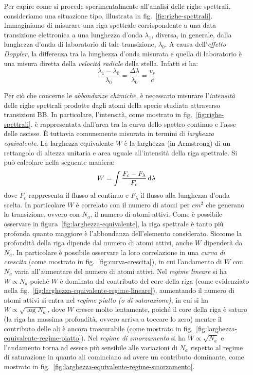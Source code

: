 Per capire come si procede sperimentalmente all'analisi delle righe spettrali, consideriamo una situazione tipo, illustrata in fig.~\ref{fig:righe-spettrali}. Immaginiamo di misurare una riga spettrale corrispondente a una data transizione elettronica a una lunghezza d'onda $\lambda_1$, diversa, in generale, dalla lunghezza d'onda di laboratorio di tale transizione, $\lambda_0$. A causa dell'\emph{effetto Doppler}, la differenza tra la lunghezza d'onda misurata e quella di laboratorio è una misura diretta della \emph{velocità radiale} della stella. Infatti si ha:
\begin{equation}\label{eq:effetto-doppler}
    \dfrac{\lambda_1 - \lambda_0}{\lambda_0} = \dfrac{\Delta \lambda}{\lambda_0} = \dfrac{v_r}{c}
\end{equation}

Per ciò che concerne le \emph{abbondanze chimiche}, è necessario misurare l'\emph{intensità} delle righe spettrali prodotte dagli atomi della specie studiata attraverso transizioni BB. In particolare, l'intensità, come mostrato in fig.~\ref{fig:righe-spettrali}, è rappresentata dall'area tra la curva dello spettro continuo e l'asse delle ascisse. È tuttavia comunemente misurata in termini di \emph{larghezza equivalente}. La larghezza equivalente $W$ è la larghezza (in Armstrong) di un rettangolo di altezza unitaria e area uguale all'intensità della riga spettrale. Si può calcolare nella seguente maniera:
\begin{equation}\label{eq:larghezza-equivalente}
    W = \int \dfrac{F_c - F_\lambda}{F_c} \mathop{\mathrm{{}d}}\mathopen{} \lambda
\end{equation} 
dove $F_c$ rappresenta il flusso al continuo e $F_\lambda$ il flusso alla lunghezza d'onda scelta. In particolare $W$ è correlato con il numero di atomi per $\si{cm^2}$ che generano la transizione, ovvero con $N_a$, il numero di atomi attivi. Come è possibile osservare in figura~\ref{fig:larghezza-equivalente}, la riga spettrale è tanto più profonda quanto maggiore è l'abbondanza dell'elemento considerato. Siccome la profondità della riga dipende dal numero di atomi attivi, anche $W$ dipenderà da $N_a$. In particolare è possibile osservare la loro correlazione in una \emph{curva di crescita} (come mostrato in fig.~\ref{fig:curva-crescita}), in cui l'andamento di $W$ con $N_a$ varia all'aumentare del numero di atomi attivi. Nel \emph{regime lineare} si ha $W \propto N_a$ poiché $W$ è dominata dal contributo del core della riga (come evidenziato nella fig.~\ref{fig:larghezza-equivalente-regime-lineare}), aumentando il numero di atomi attivi si entra nel \emph{regime piatto (o di saturazione)}, in cui si ha $W \propto \sqrt{\log N_a}$, dove $W$ cresce molto lentamente, poiché il core della riga è saturo (la riga ha massima profondità, ovvero arriva a toccare lo zero) mentre il contributo delle ali è ancora trascurabile (come mostrato in fig.~\ref{fig:larghezza-equivalente-regime-piatto}). Nel \emph{regime di smorzamento} si ha $W \propto \sqrt{N_a}$ e l'andamento torna ad essere più sensibile alle variazioni di $N_a$ rispetto al regime di saturazione in quanto ali cominciano ad avere un contributo dominante, come mostrato in fig.~\ref{fig:larghezza-equivalente-regime-smorzamento}.

